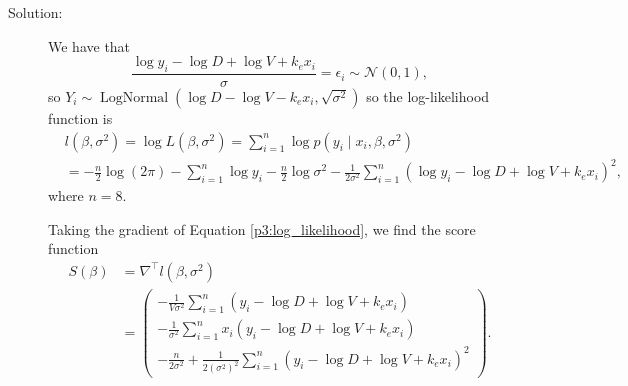 \documentclass[letterpaper,11pt]{article}
\begin{document}
\begin{enumerate}
\begin{enumerate}
    \begin{description}
    \item[Solution:] We have that
      \[
        \frac{\log y_i - \log D + \log V + k_ex_i}{\sigma} = \epsilon_i \sim
        \mathcal{N}\left(0, 1\right),
      \]
      so $Y_i \sim \operatorname{LogNormal}\left(
        \log D - \log V -  k_e x_i, \sqrt{\sigma^2}\right)$      
      so the log-likelihood function is
      \begin{align}
        &l \left(\beta, \sigma^2\right)
        =\log L\left(\beta, \sigma^2\right)
          = \sum_{i=1}^n \log p\left(y_i \mid x_i, \beta, \sigma^2\right)
          \label{p3:log_likelihood} \\
        &= -\frac{n}{2}\log\left(2\pi\right)
          - \sum_{i=1}^n \log y_i
          - \frac{n}{2}\log\sigma^2
          - \frac{1}{2\sigma^2}\sum_{i=1}^n \left(\log y_i - \log D +
          \log V + k_e x_i\right)^2, \nonumber
      \end{align}
      where $n = 8$.

      Taking the gradient of Equation \ref{p3:log_likelihood}, we find the score
      function
      \begin{align}
        S\left(\beta\right)
        &= \nabla^\intercal l\left(\beta, \sigma^2\right) \nonumber\\
        &= \begin{pmatrix}
          -\frac{1}{V\sigma^2}\sum_{i=1}^n \left(y_i - \log D +
            \log V + k_e x_i\right) \\
          -\frac{1}{\sigma^2}\sum_{i=1}^n x_i\left(y_i - \log D +
            \log V + k_e x_i\right) \\
          -\frac{n}{2\sigma^2} + \frac{1}{2\left(\sigma^2\right)^2}
          \sum_{i=1}^n \left(y_i - \log D + \log V + k_e x_i\right)^2
        \end{pmatrix}.
        \label{eqn:p3_score_function}
      \end{align}


\end{description}
\end{enumerate}
\end{enumerate}
\end{document}
